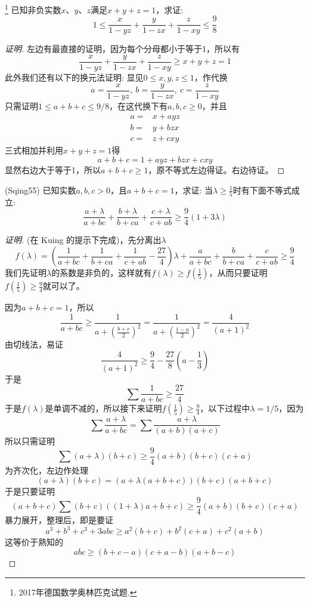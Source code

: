 \begin{exercise}\footnote{2017年德国数学奥林匹克试题.}
  已知非负实数$x$、$y$、$z$满足$x+y+z=1$，求证:
  \[ 1 \leqslant \frac{x}{1-yz}+\frac{y}{1-zx}+\frac{z}{1-xy} \leqslant \frac{9}{8} \]
\end{exercise}

\begin{proof}[证明]
  左边有最直接的证明，因为每个分母都小于等于1，所以有
  \[ \frac{x}{1-yz}+\frac{y}{1-zx}+\frac{z}{1-xy} \geqslant x+y+z = 1 \]
  此外我们还有以下的换元法证明:
  显见$0 \leqslant x,y,z \leqslant 1$，作代换
  \[ a=\frac{x}{1-yz}, \  b=\frac{y}{1-zx}, \  c=\frac{z}{1-xy} \]
  只需证明$1\leqslant a+b+c \leqslant 9/8$，在这代换下有$a,b,c \geqslant 0$，并且
  \begin{align*}
    a = {} & x+ayz \\
    b = {} & y+bzx \\
    c = {} & z+cxy
  \end{align*}
  三式相加并利用$x+y+z=1$得
  \[ a+b+c=1+ayz+bzx+cxy \]
  显然右边大于等于1，所以$a+b+c\geqslant 1$，原不等式左边得证。右边待证。
\end{proof}

\begin{exercise}
  (Sqing55) 已知实数$a,b,c>0$，且$a+b+c=1$，求证: 当$\lambda \geqslant \frac{1}{5}$时有下面不等式成立:
  \[ \frac{a+\lambda}{a+bc} + \frac{b+\lambda}{b+ca} + \frac{c+\lambda}{c+ab} \geqslant \frac{9}{4}(1+3\lambda) \]
  \begin{proof}[证明]
    (在 Kuing 的提示下完成)，先分离出$\lambda$
    \[ f(\lambda) = \left( \frac{1}{a+bc}+\frac{1}{b+ca}+\frac{1}{c+ab}-\frac{27}{4} \right) \lambda + \frac{a}{a+bc}+\frac{b}{b+ca}+\frac{c}{c+ab} \geqslant \frac{9}{4} \]
    我们先证明$\lambda$的系数是非负的，这样就有$f(\lambda)\geqslant f\left( \frac{1}{5} \right)$，从而只要证明$f\left( \frac{1}{5} \right) \geqslant \frac{9}{4}$就可以了。

    因为$a+b+c=1$，所以
    \[ \frac{1}{a+bc} \geqslant \frac{1}{a+\left( \frac{b+c}{2} \right)^2} =
    \frac{1}{a+\left( \frac{1-a}{2} \right)^2} = \frac{4}{(a+1)^2} \]
  由切线法，易证
  \[ \frac{4}{(a+1)^2} \geqslant \frac{9}{4}-\frac{27}{8}\left( a-\frac{1}{3} \right) \]
  于是
  \[ \sum \frac{1}{a+bc} \geqslant \frac{27}{4} \]
  于是$f(\lambda)$是单调不减的，所以接下来证明$f\left( \frac{1}{5} \right) \geqslant \frac{9}{4}$，以下过程中$\lambda=1/5$，因为
  \[ \sum \frac{a+\lambda}{a+bc} = \sum \frac{a+\lambda}{(a+b)(a+c)} \]
  所以只需证明
  \[ \sum (a+\lambda)(b+c) \geqslant \frac{9}{4}(a+b)(b+c)(c+a) \]
  为齐次化，左边作处理
  \[ (a+\lambda)(b+c) = (a+\lambda(a+b+c))(b+c)(a+b+c) \]
  于是只要证明
  \[ (a+b+c)\sum (b+c)((1+\lambda)a+b+c) \geqslant \frac{9}{4}(a+b)(b+c)(c+a) \]
  暴力展开，整理后，即是要证
  \[ a^3+b^3+c^3 +3abc \geqslant a^2(b+c) + b^2(c+a)+c^2(a+b) \]
  这等价于熟知的
  \[ abc \geqslant (b+c-a)(c+a-b)(a+b-c) \]
  \end{proof}
\end{exercise}

